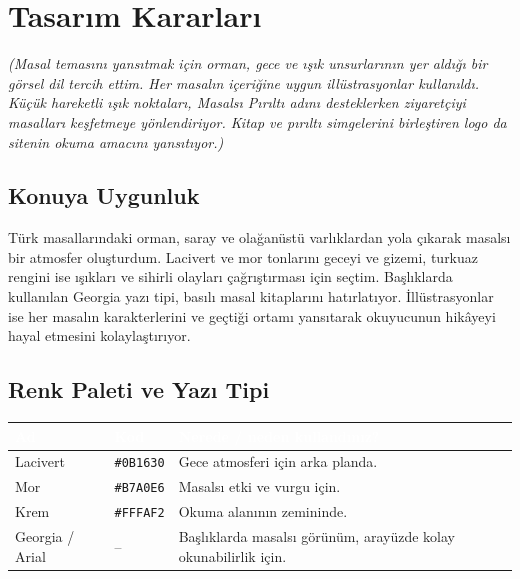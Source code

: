 \documentclass[12pt,a4paper]{article}
\newcommand{\aciklama}[1]{{\color{gray}\itshape (#1)}}
\begin{document}
\section{Tasarım Kararları}
\aciklama{Masal temasını yansıtmak için orman, gece ve ışık
unsurlarının yer aldığı bir görsel dil tercih ettim.
Her masalın içeriğine uygun illüstrasyonlar kullanıldı.
Küçük hareketli ışık noktaları, Masalsı Pırıltı adını
desteklerken ziyaretçiyi masalları keşfetmeye yönlendiriyor.
Kitap ve pırıltı simgelerini birleştiren logo da sitenin
okuma amacını yansıtıyor.}

\subsection{Konuya Uygunluk}
Türk masallarındaki orman, saray ve olağanüstü varlıklardan
yola çıkarak masalsı bir atmosfer oluşturdum. Lacivert ve
mor tonlarını geceyi ve gizemi, turkuaz rengini ise ışıkları ve sihirli olayları çağrıştırması için seçtim. Başlıklarda kullanılan Georgia yazı tipi, basılı masal kitaplarını hatırlatıyor. İllüstrasyonlar ise her masalın karakterlerini ve geçtiği ortamı yansıtarak okuyucunun hikâyeyi hayal etmesini kolaylaştırıyor.

\subsection{Renk Paleti ve Yazı Tipi}
\begin{center}
\begin{tabular}{@{}llP{6.4cm}@{}}
\toprule
{}\textcolor{white}{\textbf{Ad}} & \textcolor{white}{\textbf{Kod}} & \textcolor{white}{\textbf{Nerede / neden kullandınız?}} \\
\midrule
Lacivert & \texttt{\#0B1630} & Gece atmosferi için arka planda. \\
Mor & \texttt{\#B7A0E6} & Masalsı etki ve vurgu için. \\
Krem & \texttt{\#FFFAF2} & Okuma alanının zemininde. \\
Georgia / Arial & -- & Başlıklarda masalsı görünüm, arayüzde kolay okunabilirlik için. \\
\bottomrule
\end{tabular}
\end{center}
\end{document}
